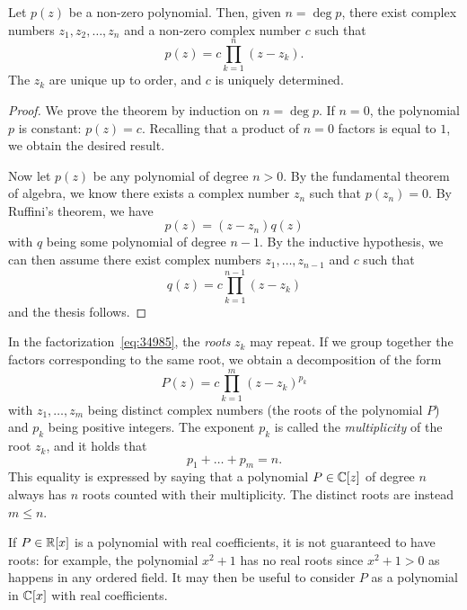 \begin{theorem}
%
%
%
Let $p(z)$ be a non-zero polynomial. Then, given $n=\deg p$, there exist complex
numbers $z_1, z_2, \dots, z_n$ and a non-zero complex number $c$ such that
\begin{equation}\label{eq:34985}
  p(z) = c \prod_{k=1}^n (z-z_k).
\end{equation}
The $z_k$ are unique up to order, and $c$ is uniquely determined.
\end{theorem}
%
\begin{proof}
We prove the theorem by induction on $n=\deg p$. If $n=0$, the polynomial $p$ is
constant: $p(z) = c$. Recalling that a product of $n=0$ factors is equal to $1$,
we obtain the desired result.

Now let $p(z)$ be any polynomial of degree $n>0$. By the fundamental theorem of
algebra, we know there exists a complex number $z_n$ such that $p(z_n)=0$. By
Ruffini's theorem, we have
\[
  p(z) = (z-z_n) q(z)
\]
with $q$ being some polynomial of degree $n-1$. By the inductive hypothesis, we
can then assume there exist complex numbers $z_1, \dots, z_{n-1}$ and $c$ such
that
\[
   q(z) = c \prod_{k=1}^{n-1} (z-z_k)
\]
and the thesis follows.
\end{proof}

In the factorization~\eqref{eq:34985}, the \emph{roots} $z_k$ may repeat. If we
group together the factors corresponding to the same root, we obtain a
decomposition of the form
\begin{equation}\label{eq:358925}
P(z) = c \prod_{k=1}^m (z-z_k)^{p_k}
\end{equation}
with $z_1, \dots, z_m$ being distinct complex numbers (the roots of the
polynomial $P$) and $p_k$ being positive integers.
The exponent $p_k$ is called the \emph{multiplicity}%
%
 of the root $z_k$, and it holds that
\[
  p_1 + \dots + p_m = n.
\]
This equality is expressed by saying that a polynomial $P\in {\mathbb C}[z]$ of degree
$n$ always has $n$ roots counted with their multiplicity.
The distinct roots are instead $m\le n$.

If $P\in {\mathbb R}[x]$ is a polynomial with real coefficients, it is not guaranteed to
have roots: for example, the polynomial $x^2+1$ has no real roots since
$x^2+1>0$ as happens in any ordered field.
It may then be useful to consider $P$ as a polynomial in ${\mathbb C}[x]$ with real
coefficients.


